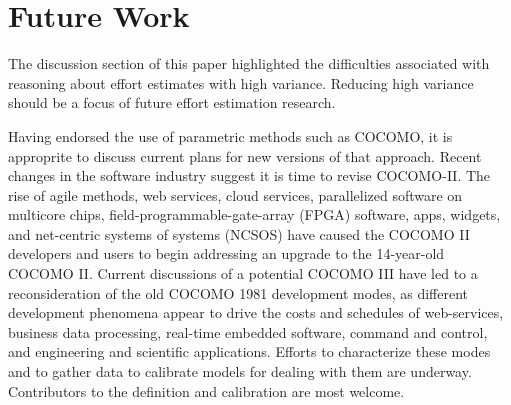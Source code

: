 \documentclass{sig-alternate}
\begin{document}
\section{Future Work}
The discussion section of this paper highlighted the difficulties
associated with reasoning about effort estimates with high variance. Reducing
high variance should be a focus of future effort estimation research.


Having endorsed the use of parametric methods such as COCOMO, it is approprite
to discuss current plans for new versions of that approach.
Recent changes  in the software industry
suggest  it is time  to revise COCOMO-II.
The rise of agile methods, web
services, cloud services, parallelized software on
multicore chips, field-programmable-gate-array
(FPGA) software, apps, widgets, and net-centric
systems of systems (NCSOS) have caused the COCOMO II
developers and users to begin addressing an upgrade
to the 14-year-old COCOMO II. 
Current discussions
of a potential COCOMO III have led to a
reconsideration of the old COCOMO 1981 development
modes, as different development phenomena appear to
drive the costs and schedules of web-services,
business data processing, real-time embedded
software, command and control, and engineering and
scientific applications.
Efforts to characterize
these modes and to gather data to calibrate models
for dealing with them are underway. Contributors
to the definition and calibration are most  welcome.  



\end{document}
